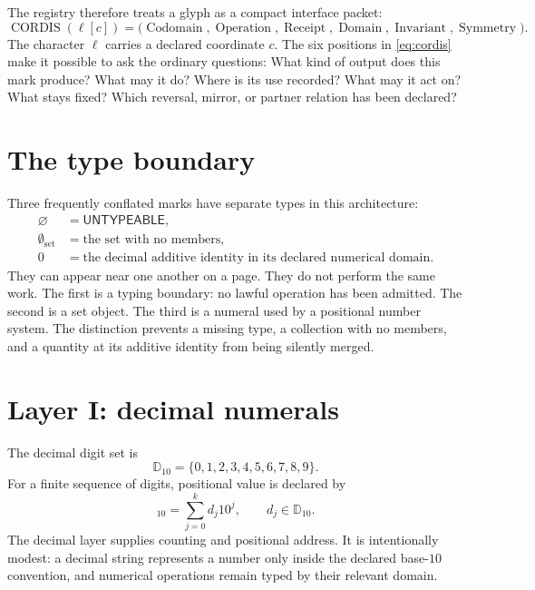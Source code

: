 \documentclass[11pt]{article}
\begin{document}
The registry therefore treats a glyph as a compact interface packet:
\begin{equation}
\operatorname{CORDIS}(\ell[c])=
\bigl(\operatorname{Codomain},\operatorname{Operation},\operatorname{Receipt},
\operatorname{Domain},\operatorname{Invariant},\operatorname{Symmetry}\bigr).
\label{eq:cordis}
\end{equation}
The character $\ell$ carries a declared coordinate $c$. The six positions in \eqref{eq:cordis} make it possible to ask the ordinary questions: What kind of output does this mark produce? What may it do? Where is its use recorded? What may it act on? What stays fixed? Which reversal, mirror, or partner relation has been declared?

\section{The type boundary}
Three frequently conflated marks have separate types in this architecture:
\begin{equation}
\begin{aligned}
\varnothing&=\mathsf{UNTYPEABLE},\\
\emptyset_{\mathrm{set}}&=\text{the set with no members},\\
0&=\text{the decimal additive identity in its declared numerical domain}.
\end{aligned}
\label{eq:nulls}
\end{equation}
They can appear near one another on a page. They do not perform the same work. The first is a typing boundary: no lawful operation has been admitted. The second is a set object. The third is a numeral used by a positional number system. The distinction prevents a missing type, a collection with no members, and a quantity at its additive identity from being silently merged.

\section{Layer I: decimal numerals}
The decimal digit set is
\begin{equation}
\mathbb{D}_{10}=\{0,1,2,3,4,5,6,7,8,9\}.
\end{equation}
For a finite sequence of digits, positional value is declared by
\begin{equation}
[d_k\ldots d_1d_0]_{10}=\sum_{j=0}^{k}d_j10^j,
\qquad d_j\in\mathbb{D}_{10}.
\label{eq:decimal}
\end{equation}
The decimal layer supplies counting and positional address. It is intentionally modest: a decimal string represents a number only inside the declared base-$10$ convention, and numerical operations remain typed by their relevant domain.
\end{document}

